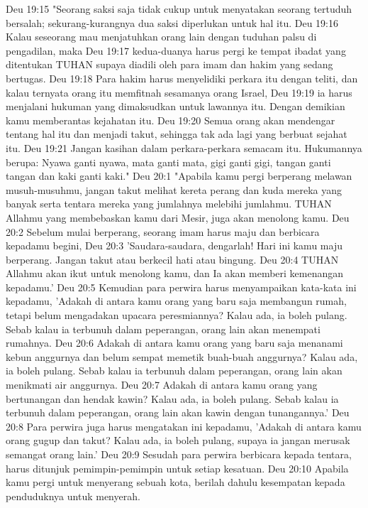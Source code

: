 Deu 19:15  "Seorang saksi saja tidak cukup untuk menyatakan seorang tertuduh bersalah; sekurang-kurangnya dua saksi diperlukan untuk hal itu.
Deu 19:16  Kalau seseorang mau menjatuhkan orang lain dengan tuduhan palsu di pengadilan, maka
Deu 19:17  kedua-duanya harus pergi ke tempat ibadat yang ditentukan TUHAN supaya diadili oleh para imam dan hakim yang sedang bertugas.
Deu 19:18  Para hakim harus menyelidiki perkara itu dengan teliti, dan kalau ternyata orang itu memfitnah sesamanya orang Israel,
Deu 19:19  ia harus menjalani hukuman yang dimaksudkan untuk lawannya itu. Dengan demikian kamu memberantas kejahatan itu.
Deu 19:20  Semua orang akan mendengar tentang hal itu dan menjadi takut, sehingga tak ada lagi yang berbuat sejahat itu.
Deu 19:21  Jangan kasihan dalam perkara-perkara semacam itu. Hukumannya berupa: Nyawa ganti nyawa, mata ganti mata, gigi ganti gigi, tangan ganti tangan dan kaki ganti kaki."
Deu 20:1  "Apabila kamu pergi berperang melawan musuh-musuhmu, jangan takut melihat kereta perang dan kuda mereka yang banyak serta tentara mereka yang jumlahnya melebihi jumlahmu. TUHAN Allahmu yang membebaskan kamu dari Mesir, juga akan menolong kamu.
Deu 20:2  Sebelum mulai berperang, seorang imam harus maju dan berbicara kepadamu begini,
Deu 20:3  'Saudara-saudara, dengarlah! Hari ini kamu maju berperang. Jangan takut atau berkecil hati atau bingung.
Deu 20:4  TUHAN Allahmu akan ikut untuk menolong kamu, dan Ia akan memberi kemenangan kepadamu.'
Deu 20:5  Kemudian para perwira harus menyampaikan kata-kata ini kepadamu, 'Adakah di antara kamu orang yang baru saja membangun rumah, tetapi belum mengadakan upacara peresmiannya? Kalau ada, ia boleh pulang. Sebab kalau ia terbunuh dalam peperangan, orang lain akan menempati rumahnya.
Deu 20:6  Adakah di antara kamu orang yang baru saja menanami kebun anggurnya dan belum sempat memetik buah-buah anggurnya? Kalau ada, ia boleh pulang. Sebab kalau ia terbunuh dalam peperangan, orang lain akan menikmati air anggurnya.
Deu 20:7  Adakah di antara kamu orang yang bertunangan dan hendak kawin? Kalau ada, ia boleh pulang. Sebab kalau ia terbunuh dalam peperangan, orang lain akan kawin dengan tunangannya.'
Deu 20:8  Para perwira juga harus mengatakan ini kepadamu, 'Adakah di antara kamu orang gugup dan takut? Kalau ada, ia boleh pulang, supaya ia jangan merusak semangat orang lain.'
Deu 20:9  Sesudah para perwira berbicara kepada tentara, harus ditunjuk pemimpin-pemimpin untuk setiap kesatuan.
Deu 20:10  Apabila kamu pergi untuk menyerang sebuah kota, berilah dahulu kesempatan kepada penduduknya untuk menyerah.
